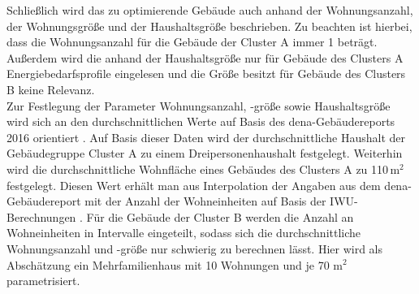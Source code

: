 Schließlich wird das zu optimierende Gebäude auch anhand der Wohnungsanzahl, der Wohnungsgröße und der Haushaltsgröße beschrieben.
Zu beachten ist hierbei, dass die Wohnungsanzahl für die Gebäude der Cluster A immer 1 beträgt.
Außerdem wird die anhand der Haushaltsgröße nur für Gebäude des Clusters A Energiebedarfsprofile eingelesen und die Größe besitzt für Gebäude des Clusters B keine Relevanz.\\
Zur Festlegung der Parameter Wohnungsanzahl, -größe sowie Haushaltsgröße wird sich an den durchschnittlichen Werte auf Basis des dena-Gebäudereports 2016 orientiert \cite{Bigalke.2016}.
Auf Basis dieser Daten wird der durchschnittliche Haushalt der Gebäudegruppe Cluster A zu einem Dreipersonenhaushalt festgelegt.
Weiterhin wird die durchschnittliche Wohnfläche eines Gebäudes des Clusters A zu 110\,m\(^2\) festgelegt. 
Diesen Wert erhält man aus Interpolation der Angaben aus dem dena-Gebäudereport mit der Anzahl der Wohneinheiten auf Basis der IWU-Berechnungen \cite{Diefenbach.12.11.2007}.
Für die Gebäude der Cluster B werden die Anzahl an Wohneinheiten in Intervalle eingeteilt, sodass sich die durchschnittliche Wohnungsanzahl und -größe nur schwierig zu berechnen lässt.
Hier wird als Abschätzung ein Mehrfamilienhaus mit 10 Wohnungen und je 70 m\(^2\) parametrisiert.




